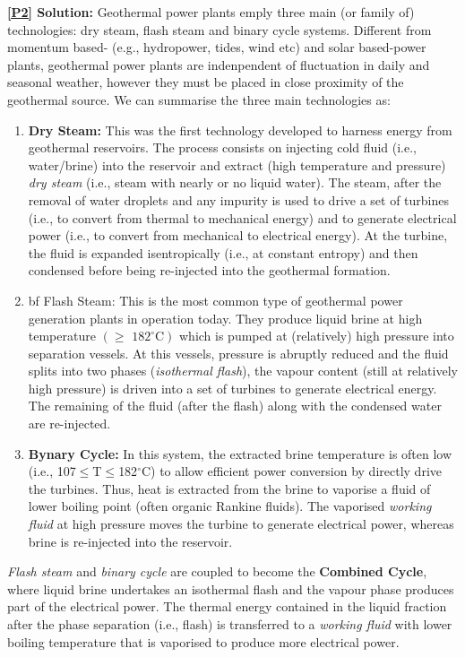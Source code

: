 \documentclass[12pts,a4paper,amsmath,amssymb,floatfix]{article}%
\renewcommand\le{\leqslant}
\renewcommand\ge{\geqslant}
\begin{document}
{\bf \ref{P2} Solution:} Geothermal power plants emply three main (or family of) technologies: dry steam, flash steam and binary cycle systems. Different from momentum based- (e.g., hydropower, tides, wind etc) and solar based-power plants, geothermal power plants are indenpendent of fluctuation in daily and seasonal weather, however they must be placed in close proximity of the geothermal source. We can summarise the three main technologies as:
\begin{enumerate}
%
    \item {\bf Dry Steam:} This was the first technology developed to harness energy from geothermal reservoirs. The process consists on injecting cold fluid (i.e., water/brine) into the reservoir and extract (high temperature and pressure) {\it dry steam} (i.e., steam with nearly or no liquid water). The steam, after the removal of water droplets and any impurity is used to drive a set of turbines (i.e., to convert from thermal to mechanical energy) and to generate electrical power (i.e., to convert from mechanical to electrical energy). At the turbine, the fluid is expanded isentropically (i.e., at constant entropy) and then condensed before being re-injected into the geothermal formation.
%
    \item {bf Flash Steam:} This is the most common type of geothermal power generation plants in operation today. They produce liquid brine at high temperature $\left(\ge\text{ 182}^{\circ}\text{C}\right)$ which is pumped at (relatively) high pressure into separation vessels. At this vessels, pressure is abruptly reduced and the fluid splits into two phases ({\it isothermal flash}), the vapour content (still at relatively high pressure) is driven into a set of turbines to generate electrical energy. The remaining of the fluid (after the flash) along with the condensed water are re-injected.
%
    \item {\bf Bynary Cycle:} In this system, the extracted brine temperature is often low (i.e., 107$\le$T$\le$182$^{\circ}$C) to allow efficient power conversion by directly drive the turbines. Thus, heat is extracted from the brine to vaporise a fluid of lower boiling point (often organic Rankine fluids). The vaporised {\it working fluid} at high pressure moves the turbine to generate electrical power, whereas brine is re-injected into the reservoir.
%
\end{enumerate}
%
{\it Flash steam} and {\it binary cycle} are coupled to become the {\bf Combined Cycle}, where liquid brine undertakes an isothermal flash and the vapour phase produces part of the electrical power. The thermal energy contained in the liquid fraction after the phase separation (i.e., flash) is transferred to a {\it working fluid} with lower boiling temperature that is vaporised to produce more electrical power.
%
\end{document}
